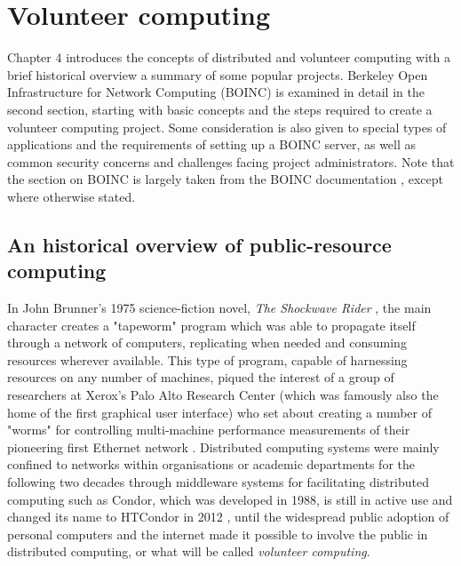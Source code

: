 \chapter{Volunteer computing}
\vspace{-2em}
\minitoc

Chapter 4 introduces the concepts of distributed and volunteer computing with a brief historical overview  a summary of some popular projects.  Berkeley Open Infrastructure for Network Computing (BOINC) is examined in detail in the second section, starting with basic concepts and the steps required to create a volunteer computing project. Some consideration is also given to special types of applications and the requirements of setting up a BOINC server, as well as common security concerns and challenges facing project administrators. Note  that the section on BOINC is largely taken from the BOINC documentation \cite{boincwiki}, except where otherwise stated. 
 
\section{An historical overview of public-resource computing} \label{VChist}
In John Brunner's 1975 science-fiction novel, \emph{The Shockwave Rider} \cite{brunner}, the main character creates a "tapeworm" program which was able to propagate itself through a network of computers, replicating when needed and consuming resources wherever available. This type of program, capable of harnessing resources on any number of machines, piqued the interest of a group of researchers at Xerox's Palo Alto Research Center (which was famously also the home of the first graphical user interface) who set about creating a number of "worms"   for controlling multi-machine performance measurements of their pioneering first Ethernet network \cite{worms}. 
Distributed computing systems  were mainly confined to networks within organisations or academic departments for the following two decades through middleware systems for facilitating distributed computing such as Condor, which was developed in 1988, is still in active use   and changed its name to HTCondor in 2012 \cite{condor}, until  the widespread public adoption of personal computers and the internet made it possible to involve the public in distributed computing, or what will be called \emph{volunteer computing}.

